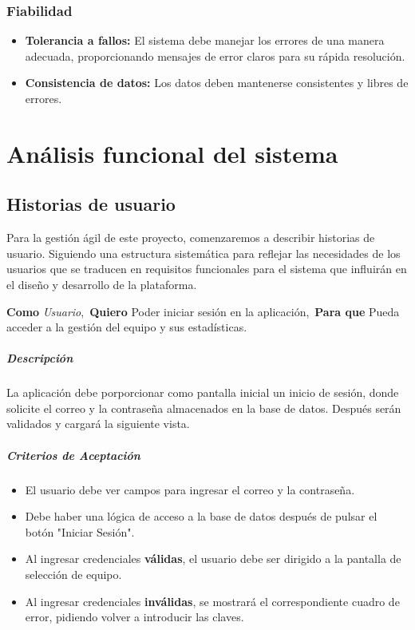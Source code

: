 \subsubsection{Fiabilidad}
\begin{itemize}
    \item \textbf{Tolerancia a fallos:} El sistema debe manejar los errores de una manera adecuada, proporcionando mensajes de error claros para su rápida resolución.
    
    \item \textbf{Consistencia de datos:} Los datos deben mantenerse consistentes y libres de errores.
    
\end{itemize}

\section{Análisis funcional del sistema}
\subsection{Historias de usuario}

Para la gestión ágil de este proyecto, comenzaremos a describir historias de usuario. Siguiendo una estructura sistemática para reflejar las necesidades de los usuarios que se traducen en requisitos funcionales para el sistema que influirán en el diseño y desarrollo de la plataforma.

\begin{tcolorbox}[title= Inicio de sesión]
\textbf{Como} \textit{Usuario},\
\textbf{Quiero} Poder iniciar sesión en la aplicación,\
\textbf{Para que} Pueda acceder a la gestión del equipo y sus estadísticas.
\end{tcolorbox}

\subparagraph{Descripción}
La aplicación debe porporcionar como pantalla inicial un inicio de sesión, donde solicite el correo y la contraseña almacenados en la base de datos. Después serán validados y cargará la siguiente vista.

\subparagraph{Criterios de Aceptación}
\begin{itemize}
\item El usuario debe ver campos para ingresar el correo y la contraseña.
\item Debe haber una lógica de acceso a la base de datos después de pulsar el botón "Iniciar Sesión".
\item Al ingresar credenciales \textbf{válidas}, el usuario debe ser dirigido a la pantalla de selección de equipo.
\item Al ingresar credenciales \textbf{inválidas}, se mostrará el correspondiente cuadro de error, pidiendo volver a introducir las claves.
\end{itemize}


